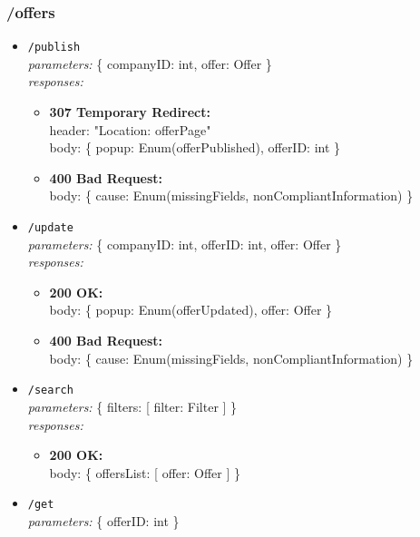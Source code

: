 \subsubsection*{/offers}
\begin{itemize}
    \item \texttt{/publish} \\
        \textit{parameters:} \{ companyID: int, offer: Offer \} \\
        \textit{responses:}
        \begin{itemize}
            \item \textbf{307 Temporary Redirect:} \\
            header: "Location: offerPage" \\
            body: \{ popup: Enum(offerPublished), offerID: int \}
            \item \textbf{400 Bad Request:} \\
            body: \{ cause: Enum(missingFields, nonCompliantInformation) \}
        \end{itemize}
    \item \texttt{/update} \\
        \textit{parameters:} \{ companyID: int, offerID: int, offer: Offer \} \\
        \textit{responses:}
        \begin{itemize}
            \item \textbf{200 OK:} \\
            body:  \{ popup: Enum(offerUpdated), offer: Offer \}
            \item \textbf{400 Bad Request:} \\
            body: \{ cause: Enum(missingFields, nonCompliantInformation) \}
        \end{itemize}
    \item \texttt{/search} \\
        \textit{parameters:} \{ filters: [ filter: Filter ] \} \\
        \textit{responses:}
        \begin{itemize}
            \item \textbf{200 OK:} \\
            body: \{ offersList: [ offer: Offer ] \}
        \end{itemize}
    \item \texttt{/get} \\
        \textit{parameters:} \{ offerID: int \} \\

\end{itemize}
